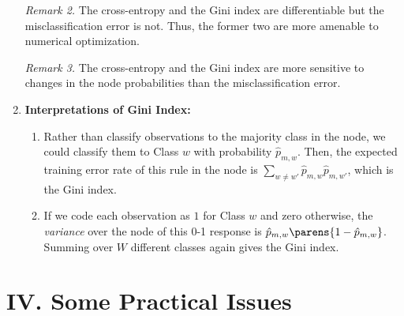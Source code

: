 \documentclass[12pt]{article}
\begin{document}
\begin{enumerate}[label=\textbf{\arabic*.}]
	\textit{Remark 2.} The cross-entropy and the Gini index are differentiable but the misclassification error is not. Thus, the former two are more amenable to numerical optimization. 
	
	\textit{Remark 3.} The cross-entropy and the Gini index are more sensitive to changes in the node probabilities than the misclassification error. 
	
	\item \textbf{Interpretations of Gini Index:} 
	\begin{enumerate}
		\item Rather than classify observations to the majority class in the node, we could classify them to Class $w$ with probability $\hat{p}_{m, w}$. Then, the expected training error rate of this rule in the node is $\sum_{w \neq w'} \hat{p}_{m, w} \hat{p}_{m, w'}$, which is the Gini index. 
		\item If we code each observation as $1$ for Class $w$ and zero otherwise, the \emph{variance} over the node of this 0-1 response is $\hat{p}_{m, w} \parens{1 - \hat{p}_{m, w}}$. Summing over $W$ different classes again gives the Gini index. 
	\end{enumerate}

\end{enumerate}


\section*{IV. Some Practical Issues}
\end{document}
